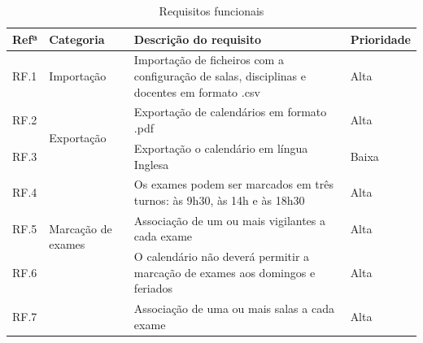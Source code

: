 \documentclass[11pt, twoside]{report}
\begin{document}
	\def\arraystretch{1.5}
	\begin{center}
		\label{requisitiosfuncionais}
		\begin{longtable}{|m{1cm}|m{2.2cm}|m{10cm}|m{2cm}|}
			\caption{Requisitos funcionais}\\
			
			\hline			
			\textbf{Refª } & \textbf{Categoria}                           & \textbf{Descrição do requisito}                                                                                          & \textbf{Prioridade} \\
			\hline
			
			
			RF.1            & Importação                                 & Importação de ficheiros com a configuração de salas, disciplinas e docentes em formato .csv                            & Alta                \\
			\hline
			
			RF.2            & \multirow{2}{2cm}{Exportação}              & Exportação de calendários em formato .pdf                                                                               & Alta                \\
			
			RF.3            &                                              & Exportação o calendário em língua Inglesa                                                                              & Baixa               \\
			\hline
			
			RF.4            & \multirow{3}{2cm}{Marcação de exames}      & Os exames podem ser marcados em três turnos: às 9h30, às 14h e às 18h30                                                & Alta                \\
			
			RF.5            &                                              & Associação de um ou mais vigilantes a cada exame                                                                         & Alta                \\
			
			RF.6            &                                              & O calendário não deverá permitir a marcação de exames aos domingos e feriados                                         & Alta                \\
			
			RF.7            &                                              & Associação de uma ou mais salas a cada exame                                                                             & Alta                \\
			

\end{longtable}
\end{center}
\end{document}
